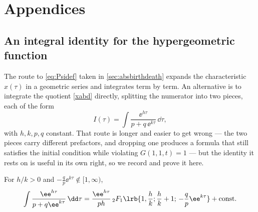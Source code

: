 \appendix
\section*{Appendices}
\renewcommand{\thesubsection}{\Alph{subsection}}
\setcounter{subsection}{0}

\subsection{An integral identity for the hypergeometric function}
\label{app:hyp}

The route to \cref{eq:Psidef} taken in \cref{sec:absbirthdeath} expands the
characteristic $x(\tau)$ in a geometric series and integrates term by term. An
alternative is to integrate the quotient \cref{xabd} directly, splitting the numerator
into two pieces, each of the form
\begin{equation}
\label{eq:Iform}
I(\tau) = \int\frac{\ee^{h\tau}}{p+q\,\ee^{k\tau}}\,\dd\tau ,
\end{equation}
with $h,k,p,q$ constant. That route is longer and easier to get wrong --- the two pieces
carry different prefactors, and dropping one produces a formula that still satisfies the
initial condition while violating $G(1,1,t)=1$ --- but the identity it rests on is useful
in its own right, so we record and prove it here.

\begin{proposition}
\label{prop:hypIden}
For $h/k>0$ and $-\tfrac{q}{p}\ee^{k\tau}\notin[1,\infty)$,
\begin{equation}
\label{hypIden}
\int\frac{\ee^{h\tau}}{p+q\ee^{k\tau}}\,\dd\tau
= \frac{\ee^{h\tau}}{ph}\,{}_2F_1\lrb{1,\frac{h}{k};\frac{h}{k}+1;\,-\frac{q}{p}\ee^{k\tau}} + \text{const}.
\end{equation}
\end{proposition}

